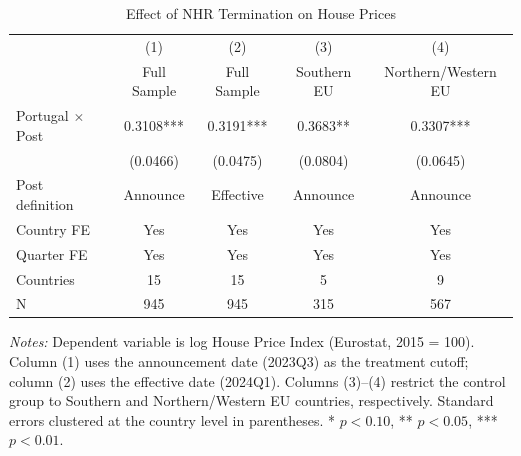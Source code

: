 \begin{table}[H]
\centering
\caption{Effect of NHR Termination on House Prices}
\begin{threeparttable}
\begin{tabular}{lcccc}
\toprule
 & (1) & (2) & (3) & (4) \\
 & Full Sample & Full Sample & Southern EU & Northern/Western EU \\
\midrule
Portugal $\times$ Post & 0.3108*** & 0.3191*** & 0.3683** & 0.3307*** \\
 & (0.0466) & (0.0475) & (0.0804) & (0.0645) \\
\midrule
Post definition & Announce & Effective & Announce & Announce \\
Country FE & Yes & Yes & Yes & Yes \\
Quarter FE & Yes & Yes & Yes & Yes \\
Countries & 15 & 15 & 5 & 9 \\
N & 945 & 945 & 315 & 567 \\
\bottomrule
\end{tabular}
\begin{tablenotes}[flushleft]
\small
\item \textit{Notes:} Dependent variable is log House Price Index (Eurostat, 2015 = 100). Column (1) uses the announcement date (2023Q3) as the treatment cutoff; column (2) uses the effective date (2024Q1). Columns (3)--(4) restrict the control group to Southern and Northern/Western EU countries, respectively. Standard errors clustered at the country level in parentheses. * $p<0.10$, ** $p<0.05$, *** $p<0.01$.
\end{tablenotes}
\end{threeparttable}
\label{tab:main}
\end{table}

